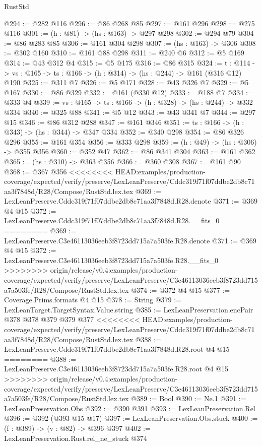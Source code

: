 \begin{lexlean}{RustStd}
\begin{coremodule}
{\begin{coremodule}
@294 := @282 @116
@296 := @86 @268 @85
@297 := @161 @296
@298 := @275 @116
@301 := (h : @81) -> (hs : @163) -> @297 @298
@302 := @294 @79
@304 := @86 @283 @85
@306 := @161 @304 @298
@307 := (hs : @163) -> @306
@308 := @302 @160
@310 := @161 @88 @298
@311 := @240 @6
@312 := @5 @169
@314 := @43 @312 @4
@315 := @5 @175
@316 := @86 @315
@324 := {t : @114} ->
  {vs : @165} -> {ts : @166} -> (h : @314) -> (hs : @244) -> @161 (@316 @12) @190
@325 := @311 @7
@326 := @5 @171
@328 := @43 @326 @7
@329 := @5 @167
@330 := @86 @329
@332 := @161 (@330 @12)
@333 := @188 @7
@334 := @333 @4
@339 := {vs : @165} -> {ts : @166} -> (h : @328) -> (hs : @244) -> @332 @334
@340 := @325 @88
@341 := @5 @12
@343 := @43 @341 @7
@344 := @297 @15
@346 := @86 @312 @288
@347 := @161 @346
@351 := {ts : @166} -> (h : @343) -> (hs : @344) -> @347 @334
@352 := @340 @298
@354 := @86 @326 @296
@355 := @161 @354
@356 := @333 @298
@359 := (h : @49) -> (hs : @306) -> @355 @356
@360 := @352 @47
@362 := @86 @341 @304
@363 := @161 @362
@365 := (hs : @310) -> @363 @356
@366 := @360 @308
@367 := @161 @90
@368 := @367 @356
<<<<<<<< HEAD:examples/production-coverage/expected/verify/preserve/LexLeanPreserve/Cddc319f71f07ddbe2db8c71aa3f7848d/R28/Compose/RustStd.lex.tex
@369 := LexLeanPreserve.Cddc319f71f07ddbe2db8c71aa3f7848d.R28.denote
@371 := @369 @4 @15
@372 := LexLeanPreserve.Cddc319f71f07ddbe2db8c71aa3f7848d.R28.__fits_0
========
@369 := LexLeanPreserve.C3e46113036eeb3f8723dd715a7a503fe.R28.denote
@371 := @369 @4 @15
@372 := LexLeanPreserve.C3e46113036eeb3f8723dd715a7a503fe.R28.__fits_0
>>>>>>>> origin/release/v0.4:examples/production-coverage/expected/verify/preserve/LexLeanPreserve/C3e46113036eeb3f8723dd715a7a503fe/R28/Compose/RustStd.lex.tex
@374 := @372 @4 @15
@377 := Coverage.Prims.formats @4 @15
@378 := String
@379 := LexLeanTarget.TargetSyntax.Value.string
@385 := LexLeanPreservation.encPair @378 @378 @379 @379 @377
<<<<<<<< HEAD:examples/production-coverage/expected/verify/preserve/LexLeanPreserve/Cddc319f71f07ddbe2db8c71aa3f7848d/R28/Compose/RustStd.lex.tex
@388 := LexLeanPreserve.Cddc319f71f07ddbe2db8c71aa3f7848d.R28.root @4 @15
========
@388 := LexLeanPreserve.C3e46113036eeb3f8723dd715a7a503fe.R28.root @4 @15
>>>>>>>> origin/release/v0.4:examples/production-coverage/expected/verify/preserve/LexLeanPreserve/C3e46113036eeb3f8723dd715a7a503fe/R28/Compose/RustStd.lex.tex
@389 := Bool
@390 := Ne.{1}
@391 := LexLeanPreservation.Obs
@392 := @390 @391
@393 := LexLeanPreservation.Rel
@396 := @392 (@393 @15 @17)
@397 := LexLeanPreservation.Obs.stuck
@400 := (f : @389) -> (v : @82) -> @396 @397
@402 := LexLeanPreservation.Rust.rel_ne_stuck @374

\end{coremodule}}
\end{coremodule}
\end{lexlean}
